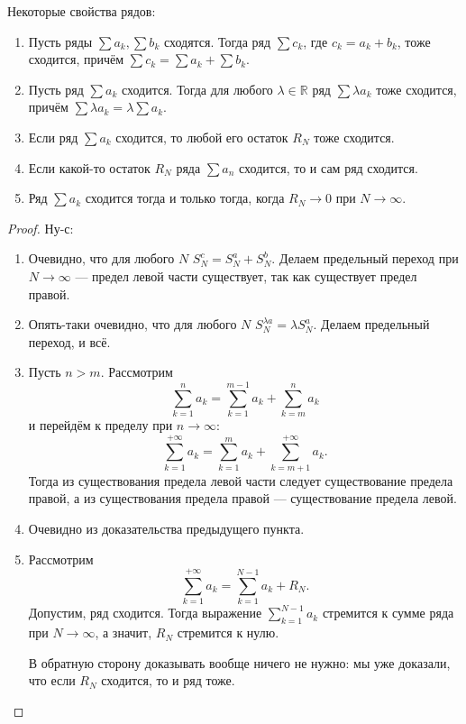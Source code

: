 \begin{theorem} \hypertarget{свойства рядов}{}
	Некоторые свойства рядов:
	\begin{enumerate}
		\item Пусть ряды  \(\sum a_k, \sum b_k\) сходятся. Тогда ряд \(\sum c_k\), где \(c_k = a_k + b_k\), тоже сходится, причём \(\sum c_k = \sum a_k + \sum b_k\).
		\item Пусть ряд \(\sum a_k\) сходится. Тогда для любого \(\lambda \in \mathbb{R}\) ряд \(\sum \lambda a_k\) тоже сходится, причём \(\sum \lambda a_k = \lambda \sum a_k\).
		\item Если ряд \(\sum a_k\) сходится, то любой его остаток \(R_N\) тоже сходится.
		\item Если какой-то остаток \(R_N\) ряда \(\sum a_n\) сходится, то и сам ряд сходится.
		\item Ряд \(\sum a_k\) сходится тогда и только тогда, когда \(R_N \to 0\) при \(N \to \infty\).
	\end{enumerate}
\end{theorem}
\begin{proof}
	Ну-с:
	\begin{enumerate}
		\item Очевидно, что для любого \(N\) \(S_N^c = S_N^a + S_N^b\). Делаем предельный переход при \(N \to \infty\) --- предел левой части существует, так как существует предел правой.
		\item Опять-таки очевидно, что для любого \(N\) \(S_N^{\lambda a} = \lambda S_N^a\). Делаем предельный переход, и всё.
		\item Пусть \(n > m\). Рассмотрим \[
		\sum_{k=1}^{n} a_k = \sum_{k=1}^{m-1} a_k + \sum_{k=m}^{n} a_k
		\]
		и перейдём к пределу при \(n \to \infty\): \[
		\sum_{k=1}^{+\infty} a_k = \sum_{k=1}^{m} a_k + \sum_{k=m+1}^{+\infty} a_k.
		\]
		Тогда из существования предела левой части следует существование предела правой, а из существования предела правой --- существование предела левой.
		\item Очевидно из доказательства предыдущего пункта.
		\item Рассмотрим \[
		\sum_{k=1}^{+\infty} a_k = \sum_{k=1}^{N-1} a_k + R_N.
		\]
		Допустим, ряд сходится. Тогда выражение \(\sum\limits_{k=1}^{N-1} a_k\) стремится к сумме ряда при \(N \to \infty\), а значит, \(R_N\) стремится к нулю.
		
		В обратную сторону доказывать вообще ничего не нужно: мы уже доказали, что если \(R_N\) сходится, то и ряд тоже.
	\end{enumerate}
\end{proof}

